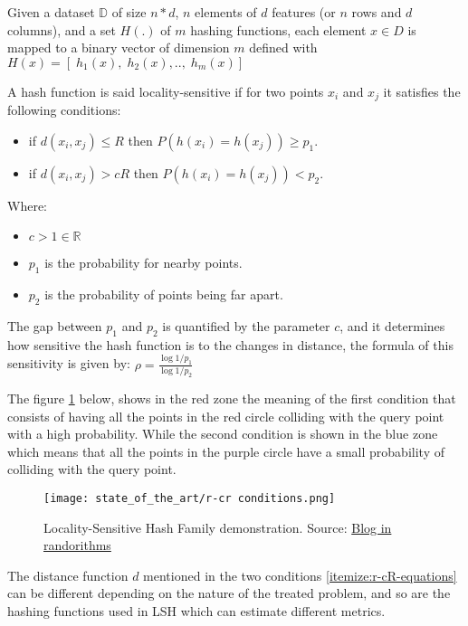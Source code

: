 \label{sect:lsh_formulation}
Given a dataset $\mathbb{D}$ of size $n * d$, $n$ elements of $d$
features (or $n$ rows and $d$ columns), and a set $H(.)$ of $m$ hashing
functions, each element $x \in D$ is mapped to a binary vector of dimension
$m$ defined with $H(x)= [\; h_1(x),\;h_2(x), .., \;h_m(x)] $
\citep{chi_zhu_2017}

A hash function is said locality-sensitive if for two points $x_i$ and $x_j$ it
satisfies the following conditions:
\begin{itemize}
    \item if $d(x_i, x_j) \leq R$ then $P(h(x_i )= h(x_j )) \geq p_1$.
    \item if $d(x_i,x_j) > cR$ then $P(h(x_i) = h(x_j)) <p_2$.
\end{itemize}
Where:
\begin{multicols}{2}
    \begin{itemize}
        \label{itemize:r-cR-equations}
        \item $c > 1 \in \mathbb{R}$
        \item $p_1$ is the probability for nearby points.
        \item $p_2$ is the probability of points being far apart.
    \end{itemize}
\end{multicols}

The gap between $p_1$ and $p_2$ is quantified by the parameter $c$, and it
determines how sensitive the hash function is to the changes in distance, the
formula of this sensitivity is given by: $\rho = \frac{\log{1/ p_1}}{\log{1/
            p_2}}$

The figure \ref{fig:r_cr_condition} below, shows in the red zone the meaning of
the first condition that consists of having all the points in the red circle
colliding with the query point with a high probability. While the second
condition is shown in the blue zone which means that all the points in the
purple circle have a small probability of colliding with the query point.

\begin{figure}[h]
    \centering
    \texttt{[image: state\_of\_the\_art/r-cr conditions.png]}
    \caption{Locality-Sensitive Hash Family demonstration. Source:
        \href{https://randorithms.com/2019/09/19/Visual-LSH.html}{Blog in
            randorithms}}
    \label{fig:r_cr_condition}
\end{figure}

The distance function $d$ mentioned in the two conditions
\ref{itemize:r-cR-equations} can be different depending on the nature of the
treated problem, and so are the hashing functions used in LSH which can estimate
different metrics.